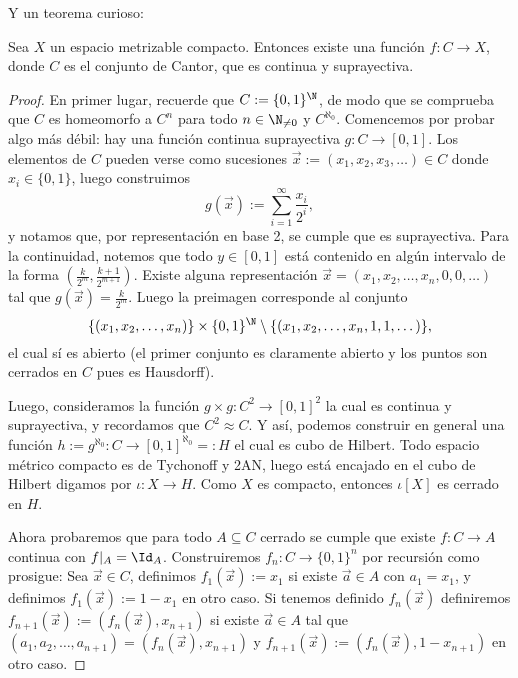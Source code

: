 \documentclass[topologia-analisis.tex]{subfiles}
\begin{document}
Y un teorema curioso:
\begin{thm}
	Sea $X$ un espacio metrizable compacto.
	Entonces existe una función $f\colon C \to X$, donde $C$ es el conjunto de Cantor, que es continua y suprayectiva.
\end{thm}
\begin{proof}
	En primer lugar, recuerde que $C := \{ 0, 1 \}^\N$, de modo que se comprueba que $C$ es homeomorfo a $C^n$ para todo $n \in \N_{\ne 0}$
	y $C^{\aleph_0}$.
	Comencemos por probar algo más débil: hay una función continua suprayectiva $g\colon C \to [0, 1]$.
	Los elementos de $C$ pueden verse como sucesiones $\vec x := (x_1, x_2, x_3, \dots) \in C$ donde $x_i \in \{ 0, 1 \}$, luego construimos
	$$ g(\vec x) := \sum_{i=1}^{\infty} \frac{x_i}{2^i}, $$
	y notamos que, por representación en base 2, se cumple que es suprayectiva.
	Para la continuidad, notemos que todo $y \in [0, 1]$ está contenido en algún intervalo de la forma $\left( \frac{k}{2^m}, \frac{k+1}{2^{m+1}} \right)$.
	Existe alguna representación $\vec x = (x_1, x_2, \dots, x_n, 0, 0, \dots)$ tal que $g(\vec x) = \frac{k}{2^m}$.
	Luego la preimagen corresponde al conjunto
	$$ \{ (x_1, x_2, \dots, x_n) \} \times \{ 0, 1 \}^\N \setminus \{ (x_1, x_2, \dots, x_n, 1, 1, \dots) \}, $$
	el cual sí es abierto (el primer conjunto es claramente abierto y los puntos son cerrados en $C$ pues es Hausdorff).

	Luego, consideramos la función $g\times g\colon C^2 \to [0, 1]^2$ la cual es continua y suprayectiva, y recordamos que $C^2 \approx C$.
	Y así, podemos construir en general una función $h := g^{\aleph_0} \colon C \to [0, 1]^{\aleph_0} =: H$ el cual es cubo de Hilbert.
	Todo espacio métrico compacto es de Tychonoff y 2AN, luego está encajado en el cubo de Hilbert digamos por $\iota\colon X \to H$.
	Como $X$ es compacto, entonces $\iota[X]$ es cerrado en $H$.

	Ahora probaremos que para todo $A \subseteq C$ cerrado se cumple que existe $f\colon C \to A$ continua con $f|_A = \Id_A$.
	Construiremos $f_n\colon C \to \{ 0, 1 \}^n$ por recursión como prosigue:
	Sea $\vec x \in C$, definimos $f_1(\vec x) := x_1$ si existe $\vec a \in A$ con $a_1 = x_1$, y definimos $f_1(\vec x) := 1 - x_1$ en otro caso.
	Si tenemos definido $f_n(\vec x)$ definiremos $f_{n+1}(\vec x) := (f_n(\vec x), x_{n+1})$ si existe $\vec a \in A$ tal que
	$(a_1, a_2, \dots, a_{n+1}) = (f_n(\vec x), x_{n+1})$ y $f_{n+1}(\vec x) := (f_n(\vec x), 1 - x_{n+1})$ en otro caso.


\end{proof}
\end{document}
